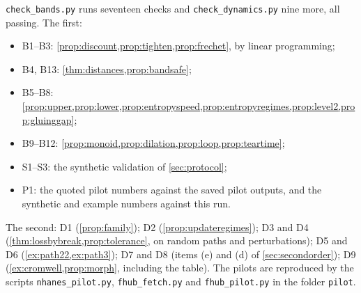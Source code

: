 \documentclass[11pt]{article}
\theoremstyle{definition}
\theoremstyle{remark}
\begin{document}
\texttt{check\_bands.py} runs seventeen checks and \texttt{check\_dynamics.py} nine more, all passing. The first:
\begin{itemize}[leftmargin=*,nosep]
\item B1--B3: \cref{prop:discount,prop:tighten,prop:frechet}, by linear programming;
\item B4, B13: \cref{thm:distances,prop:bandsafe};
\item B5--B8: \cref{prop:upper,prop:lower,prop:entropyspeed,prop:entropyregimes,prop:level2,prop:gluinggap};
\item B9--B12: \cref{prop:monoid,prop:dilation,prop:loop,prop:teartime};
\item S1--S3: the synthetic validation of \cref{sec:protocol};
\item P1: the quoted pilot numbers against the saved pilot outputs, and the synthetic and example numbers against this run.
\end{itemize}
The second: D1 (\cref{prop:family}); D2 (\cref{prop:updateregimes}); D3 and D4 (\cref{thm:lossbybreak,prop:tolerance}, on random paths
and perturbations); D5 and D6 (\cref{ex:path22,ex:path3}); D7 and D8 (items (e) and (d) of \cref{sec:secondorder}); D9 (\cref{ex:cromwell,prop:morph},
including the table).
The pilots are reproduced by the scripts \texttt{nhanes\_pilot.py}, \texttt{fhub\_fetch.py} and \texttt{fhub\_pilot.py} in the
folder \texttt{pilot}.
\end{document}

